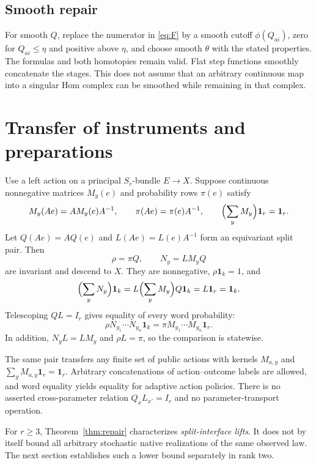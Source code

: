 \documentclass[11pt]{article}
\theoremstyle{definition}
\newcommand{\one}{\mathbf 1}
\begin{document}
\subsection{Smooth repair}
For smooth $Q$, replace the numerator in \eqref{eq:F} by a smooth cutoff $\phi(Q_{ai})$, zero for $Q_{ai}\leq\eta$ and positive above $\eta$, and choose smooth $\theta$ with the stated properties. The formulas and both homotopies remain valid. Flat step functions smoothly concatenate the stages. This does not assume that an arbitrary continuous map into a singular Hom complex can be smoothed while remaining in that complex.

\section{Transfer of instruments and preparations}
Use a left action on a principal $S_r$-bundle $E\to X$. Suppose continuous nonnegative matrices $M_y(e)$ and probability rows $\pi(e)$ satisfy
\[
 M_y(Ae)=AM_y(e)A^{-1},\qquad
 \pi(Ae)=\pi(e)A^{-1},\qquad
 \Bigl(\sum_yM_y\Bigr)\one_r=\one_r.
\]
Let $Q(Ae)=AQ(e)$ and $L(Ae)=L(e)A^{-1}$ form an equivariant split pair. Then
\begin{equation}\label{eq:transfer}
 \rho=\pi Q,\qquad N_y=LM_yQ
\end{equation}
are invariant and descend to $X$. They are nonnegative, $\rho\one_k=1$, and
\[
 \Bigl(\sum_yN_y\Bigr)\one_k
 =L\Bigl(\sum_yM_y\Bigr)Q\one_k=L\one_r=\one_k.
\]
Telescoping $QL=I_r$ gives equality of every word probability:
\[
 \rho N_{y_1}\cdots N_{y_n}\one_k
 =\pi M_{y_1}\cdots M_{y_n}\one_r.
\]
In addition, $N_yL=LM_y$ and $\rho L=\pi$, so the comparison is statewise.

The same pair transfers any finite set of public actions with kernels $M_{a,y}$ and $\sum_yM_{a,y}\one_r=\one_r$. Arbitrary concatenations of action--outcome labels are allowed, and word equality yields equality for adaptive action policies. There is no asserted cross-parameter relation $Q_xL_{x'}=I_r$ and no parameter-transport operation.

For $r\geq3$, Theorem~\ref{thm:repair} characterizes \emph{split-interface lifts}. It does not by itself bound all arbitrary stochastic native realizations of the same observed law. The next section establishes such a lower bound separately in rank two.
\end{document}
